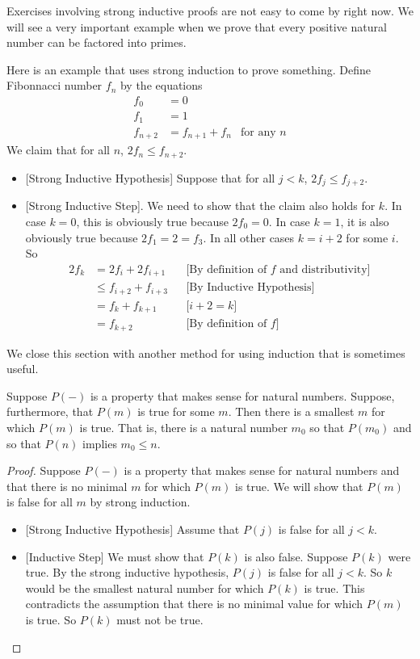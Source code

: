 Exercises involving strong inductive proofs are not easy to come by right now.
We will see a very important example when we prove that every positive natural number can be factored into primes.

\begin{example}
Here is an example that uses strong induction to prove something. Define Fibonnacci number $f_n$ by the equations
\begin{align*}
  f_0 &= 0\\
  f_1 &= 1\\
  f_{n+2} &= f_{n+1} + f_n & \text{for any $n$}
\end{align*}
We claim that for all $n$, $2f_n \leq f_{n+2}$.

\begin{itemize}
\item{}[Strong Inductive Hypothesis] Suppose that for all $j<k$, $2f_j \leq f_{j+2}$.
\item{}[Strong Inductive Step]. We need to show that the claim also holds 
for $k$.
In case $k=0$, this is obviously true because $2f_0 = 0$. In case
$k=1$, it is also obviously true because $2f_1 = 2 = f_3$. 
In all other cases $k=i+2$ for some $i$. So 
\begin{align*}
2f_k  &= 2f_i + 2f_{i+1}&&\text{[By definition of $f$ and distributivity]}\\ 
      &\leq f_{i+2} + f_{i+3}&&\text{[By Inductive Hypothesis]}\\
      &= f_k + f_{k+1}&&\text{[$i+2=k$]}\\
      &= f_{k+2}&&\text{[By definition of $f$]}
    \end{align*}
\end{itemize}
\end{example}

We close this section with another method for using induction that is sometimes useful. 

\begin{lemma}\label{lem:N-well-ordered}
Suppose $P(-)$ is a property that makes sense for natural numbers. Suppose, furthermore, that $P(m)$ is
true for some $m$. Then there is a smallest $m$ for which $P(m)$ is true. That is, there is
a natural number $m_0$ so that $P(m_0)$ and so that $P(n)$ implies $m_0\leq n$. 
\begin{proof}
  Suppose $P(-)$ is a property that makes sense for natural numbers and that there is no
minimal $m$ for which $P(m)$ is true. We will show that $P(m)$ is false for all $m$ by strong induction.
\begin{itemize}
\item{}[Strong Inductive Hypothesis] Assume that $P(j)$ is false for all $j<k$.
\item{}[Inductive Step] We must show that $P(k)$ is also false. Suppose $P(k)$
were true. By the strong inductive hypothesis, $P(j)$ is false for all $j<k$. So $k$ would be the smallest
natural number for which $P(k)$ is true. This contradicts the assumption that there is no minimal value
for which $P(m)$ is true. So $P(k)$ must not be true.
\end{itemize}
\end{proof}
\end{lemma}

